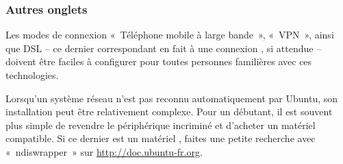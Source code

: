 {\subsubsection{Autres onglets}
Les modes de connexion «~Téléphone mobile à large bande~», «~VPN~», ainsi que DSL -- ce dernier correspondant en fait à une connexion , si attendue -- doivent être faciles à configurer pour toutes personnes familières avec ces technologies.
\begin{nota}
\label{RefNoteDongleWifi}
Lorsqu'un système réseau n'est pas reconnu automatiquement par Ubuntu, son installation peut être relativement complexe. Pour un débutant, il est souvent plus simple de revendre le périphérique incriminé et d'acheter un matériel compatible. Si ce dernier est un matériel , faites une petite recherche avec «~ndiswrapper~» sur \url{http://doc.ubuntu-fr.org}.
\end{nota}
}
